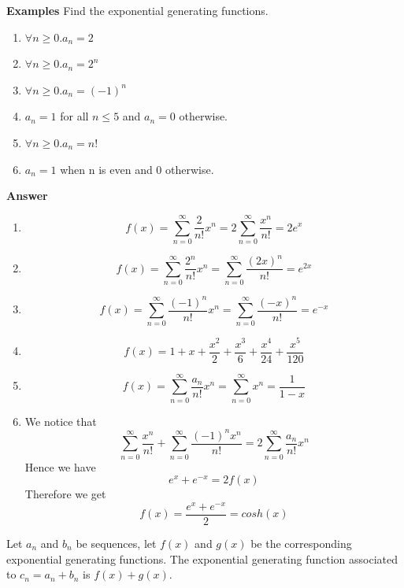 \noindent \textbf{Examples} Find the exponential generating functions.
\begin{enumerate}
    \item $\forall n \geq 0.a_n=2$
    \item $\forall n \geq 0.a_n=2^n$
    \item $\forall n \geq 0.a_n=(-1)^n$
    \item $a_n=1$ for all $n \leq 5$ and $a_n=0$ otherwise.
    \item $\forall n \geq 0.a_n=n!$
    \item $a_n=1$ when n is even and 0 otherwise.
\end{enumerate}
\textbf{Answer}
\begin{enumerate}
    \item $$
            f(x) = \sum_{n=0}^{\infty}\frac{2}{n!}x^n
            = 2 \sum_{n=0}^{\infty}\frac{x^n}{n!}
            = 2e^x
    $$
    \item $$
        f(x) = \sum_{n=0}^{\infty}\frac{2^n}{n!}x^n
        = \sum_{n=0}^{\infty}\frac{(2x)^n}{n!}
        = e^{2x}
    $$
    \item $$
        f(x) = \sum_{n=0}^{\infty}\frac{(-1)^n}{n!}x^n
        = \sum_{n=0}^{\infty}\frac{(-x)^n}{n!}
        = e^{-x}
    $$
    \item $$f(x)=1+x+\frac{x^2}{2}+\frac{x^3}{6}+\frac{x^4}{24}+\frac{x^5}{120}$$
    \item $$
    f(x) = \sum_{n=0}^{\infty}\frac{a_n}{n!}x^n
    = \sum_{n=0}^{\infty}x^n
    = \frac{1}{1-x}
    $$
    \item We notice that $$\sum_{n=0}^{\infty}\frac{x^n}{n!}+\sum_{n=0}^{\infty}\frac{(-1)^nx^n}{n!}=2\sum_{n=0}^{\infty}\frac{a_n}{n!}x^n$$
    Hence we have $$e^x+e^{-x}=2f(x)$$
    Therefore we get $$f(x)=\frac{e^x+e^{-x}}{2}=cosh(x)$$
\end{enumerate}

\begin{theorem}[Linearity]
    Let $a_n$ and $b_n$ be sequences, let $f(x)$ and $g(x)$ be the corresponding exponential generating functions. 
    The exponential generating function associated to $c_n =a_n+b_n$ is $f(x)+g(x)$.
\end{theorem}

